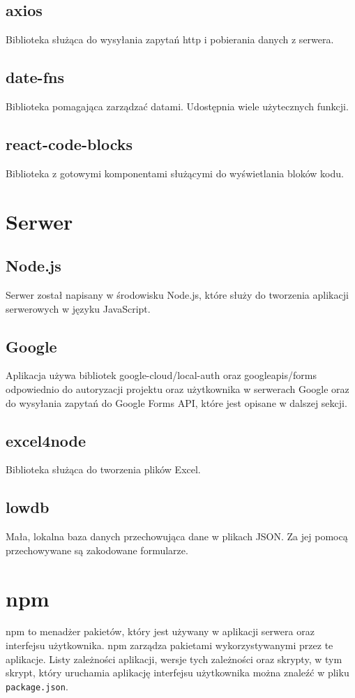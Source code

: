 \subsection{axios}
Biblioteka służąca do wysyłania zapytań http i pobierania danych z serwera.

\subsection{date-fns}
Biblioteka pomagająca zarządzać datami. Udostępnia wiele użytecznych funkcji.

\subsection{react-code-blocks}
Biblioteka z gotowymi komponentami służącymi do wyświetlania bloków kodu.

\section{Serwer}

\subsection{Node.js}
Serwer został napisany w środowisku Node.js, które służy do tworzenia aplikacji
serwerowych w języku JavaScript.

\subsection{Google}
Aplikacja używa bibliotek google-cloud/local-auth oraz googleapis/forms
odpowiednio do autoryzacji projektu oraz użytkownika w serwerach Google 
oraz do wysyłania zapytań do Google Forms API, które jest opisane w dalszej sekcji.

\subsection{excel4node}
Biblioteka służąca do tworzenia plików Excel.

\subsection{lowdb}
Mała, lokalna baza danych przechowująca dane w plikach JSON. Za jej pomocą
przechowywane są zakodowane formularze.

\section{npm}
npm to menadżer pakietów, który jest używany w aplikacji serwera oraz interfejsu użytkownika.
npm zarządza pakietami wykorzystywanymi przez te aplikacje. Listy zależności aplikacji, 
wersje tych zależności
oraz skrypty, w tym skrypt, który uruchamia aplikację interfejsu użytkownika można znaleźć
w pliku \texttt{package.json}.

